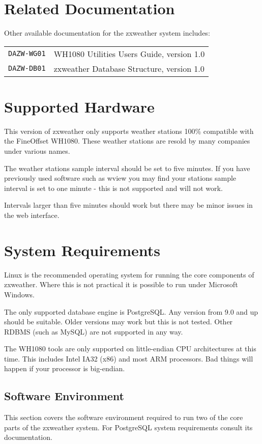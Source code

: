 \documentclass[a4paper,10pt,draft]{book}
\begin{document}
\section{Related Documentation}
Other available documentation for the zxweather system includes:

\begin{tabular}{l l}
\verb|DAZW-WG01| & WH1080 Utilities Users Guide, version 1.0 \\
\verb|DAZW-DB01| & zxweather Database Structure, version 1.0 \\
\end{tabular}

\section{Supported Hardware}
This version of zxweather only supports weather stations 100\% compatible with the FineOffset WH1080. These weather stations are resold by many companies under various names.

The weather stations sample interval should be set to five minutes. If you have previously used software such as wview you may find your stations sample interval is set to one minute - this is not supported and will not work.

Intervals larger than five minutes should work but there may be minor issues in the web interface.

\section{System Requirements}
Linux is the recommended operating system for running the core components of zxweather. Where this is not practical it is possible to run under Microsoft Windows.

The only supported database engine is PostgreSQL. Any version from 9.0 and up should be suitable. Older versions may work but this is not tested. Other RDBMS (such as MySQL) are not supported in any way.

The WH1080 tools are only supported on little-endian CPU architectures at this time. This includes Intel IA32 (x86) and most ARM processors. Bad things will happen if your processor is big-endian.

\subsection{Software Environment}
This section covers the software environment required to run two of the core parts of the zxweather system. For PostgreSQL system requirements consult its documentation.
\end{document}
